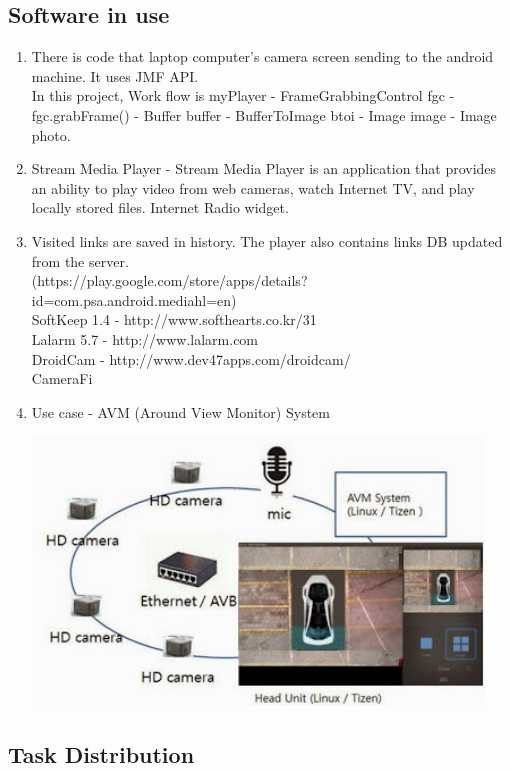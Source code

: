 \documentclass[12pt]{article}
\begin{document}
\subsection{Software in use}
\begin{enumerate}
\item There is code that laptop computer’s camera screen sending to the android machine. It uses JMF API.\\ In this project, Work flow is myPlayer - FrameGrabbingControl fgc - fgc.grabFrame() - Buffer buffer - BufferToImage btoi
- Image image - Image photo.

\item Stream Media Player - Stream Media Player is an application that provides an ability to play video from web cameras, watch Internet TV, and play locally stored files. Internet Radio widget.
\item Visited links are saved in history. The player also contains links DB updated from the server.\\
(https://play.google.com/store/apps/details?id=com.psa.android.mediahl=en)\\
SoftKeep 1.4 - http://www.softhearts.co.kr/31\\
Lalarm 5.7 - http://www.lalarm.com\\
DroidCam - http://www.dev47apps.com/droidcam/\\
CameraFi
\item Use case - AVM (Around View Monitor) System\\
\begin{center} 
\includegraphics[width=120mm,scale=2]{avm}
\end{center}
\end{enumerate}

\subsection{Task Distribution}
\end{document}

